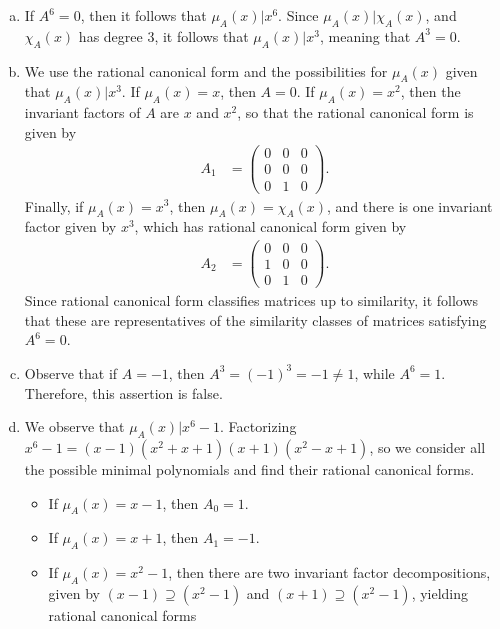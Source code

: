 \documentclass[10pt]{mypackage}
\begin{document}
\begin{solution}\hfill
  \begin{enumerate}[(a)]
    \item If $A^{6} = 0$, then it follows that $\mu_A(x) | x^{6}$. Since $\mu_A(x) | \chi_A(x)$, and $\chi_A(x)$ has degree $3$, it follows that $\mu_A(x) | x^{3}$, meaning that $A^{3} = 0$.
    \item We use the rational canonical form and the possibilities for $\mu_A(x)$ given that $\mu_A(x) | x^{3}$. If $\mu_A(x) = x$, then $A=0$. If $\mu_A(x) = x^2$, then the invariant factors of $A$ are $x$ and $x^2$, so that the rational canonical form is given by
      \begin{align*}
        A_1 &= \begin{pmatrix}0 & 0 & 0 \\ 0 & 0 & 0 \\ 0 & 1 & 0\end{pmatrix}.
      \end{align*}
      Finally, if $\mu_A(x) = x^3$, then $\mu_A(x) = \chi_A(x)$, and there is one invariant factor given by $x^3$, which has rational canonical form given by
      \begin{align*}
        A_2 &= \begin{pmatrix}0 & 0 & 0 \\ 1 & 0 & 0 \\ 0 & 1 & 0\end{pmatrix}.
      \end{align*}
      Since rational canonical form classifies matrices up to similarity, it follows that these are representatives of the similarity classes of matrices satisfying $A^{6} = 0$.
    \item Observe that if $A = -1$, then $A^3 = \left( -1 \right)^{3} = -1\neq 1$, while $A^{6} = 1$. Therefore, this assertion is false.
    \item We observe that $\mu_A(x) | x^6 - 1$. Factorizing $x^{6}-1 = \left( x-1 \right)\left( x^2 + x + 1 \right)\left( x+1 \right)\left( x^2-x+1 \right)$, so we consider all the possible minimal polynomials and find their rational canonical forms.
      \begin{itemize}
        \item If $\mu_A(x) = x-1$, then $A_0 = 1$.
        \item If $\mu_A(x) = x + 1$, then $A_1 = -1$.
        \item If $\mu_A(x) = x^2 - 1$, then there are two invariant factor decompositions, given by $\left( x-1 \right)\supseteq \left( x^2-1 \right)$ and $\left( x+1 \right)\supseteq \left( x^2-1 \right)$, yielding rational canonical forms

\end{itemize}
\end{enumerate}
\end{solution}
\end{document}
